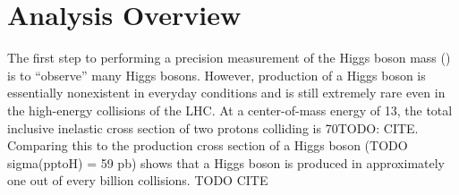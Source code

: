 \section{Analysis Overview}
\label{sec:analysis_overview}
The first step to performing a precision measurement of the Higgs boson mass (\mH) is to ``observe'' many Higgs bosons.
However, production of a Higgs boson is essentially nonexistent in everyday conditions and is still extremely rare even in the high-energy \pp collisions of the LHC.
At a center-of-mass energy of 13\TeV, the total inclusive inelastic cross section of two protons colliding is 70\mb TODO: CITE.
Comparing this to the production cross section of a Higgs boson (TODO sigma(pptoH) = 59 pb) shows that a Higgs boson is produced in approximately one out of every billion \pp collisions.  TODO CITE

